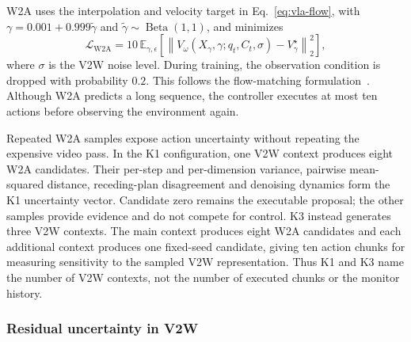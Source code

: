 W2A uses the interpolation and velocity target in
Eq.~\eqref{eq:vla-flow}, with
\(\gamma=0.001+0.999\tilde{\gamma}\) and
\(\tilde{\gamma}\sim\operatorname{Beta}(1,1)\), and minimizes
\begin{equation}
  \mathcal{L}_{\mathrm{W2A}}
  =
  10\,\mathbb{E}_{\gamma,\epsilon}
  \left[
    \left\|
      V_\omega(X_\gamma,\gamma;q_t,C_t,\sigma)
      -V^\star_\gamma
    \right\|_2^2
  \right],
  \label{eq:w2a-loss}
\end{equation}
where \(\sigma\) is the V2W noise level. During training, the observation
condition is dropped with probability \(0.2\). This follows the flow-matching
formulation~\cite{flowmatching}. Although W2A predicts a long sequence, the
controller executes at most ten actions before observing the environment
again.

Repeated W2A samples expose action uncertainty without repeating the expensive
video pass. In the K1 configuration, one V2W context produces eight W2A
candidates. Their per-step and per-dimension variance, pairwise mean-squared
distance, receding-plan disagreement and denoising dynamics form the K1
uncertainty vector. Candidate zero remains the executable proposal; the other
samples provide evidence and do not compete for control. K3 instead generates
three V2W contexts. The main context produces eight W2A candidates and each
additional context produces one fixed-seed candidate, giving ten action chunks
for measuring sensitivity to the sampled V2W representation. Thus K1 and K3
name the number of V2W contexts, not the number of executed chunks or the
monitor history.

\subsubsection{Residual uncertainty in V2W}


